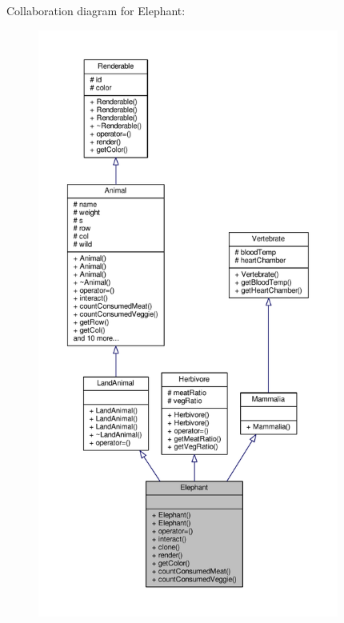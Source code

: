 Collaboration diagram for Elephant\+:
\nopagebreak
\begin{figure}[H]
\begin{center}
\leavevmode
\includegraphics[height=550pt]{classElephant__coll__graph}
\end{center}
\end{figure}
